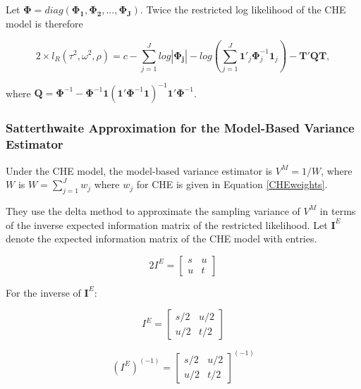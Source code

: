 Let $\mathbf{\Phi} = diag(\mathbf{\Phi_1}, \mathbf{\Phi_2}, ..., \mathbf{\Phi_J})$. Twice the restricted log likelihood of the CHE model is therefore


\begin{equation}\label{LLCHE}
    2\times l_R(\tau^2, \omega^2, \rho) = c - \sum^J_{j=1}log|\mathbf{\Phi_j}| - log(\sum^J_{j=1}\mathbf{1'}_j\mathbf{\Phi}^{-1}_j\mathbf{1}_j)-\mathbf{T}'\mathbf{Q}\mathbf{T},
\end{equation}

where $\mathbf{Q} = \mathbf{\Phi}^{-1}-\mathbf{\Phi}^{-1}\mathbf{1}(\mathbf{1}'\mathbf{\Phi}^{-1}\mathbf{1})^{-1}\mathbf{1}'\mathbf{\Phi}^{-1}$.


\subsubsection{Satterthwaite Approximation for the Model-Based Variance Estimator}

Under the CHE model, the model-based variance estimator is $V^M = 1/W$, where $W$ is $W = \sum^J_{j=1} w_j$ where $w_j$ for CHE is given in Equation \ref{CHEweights}.


They use the delta method to approximate the sampling variance of $V^M$ in terms of the inverse expected information matrix of the restricted likelihood. Let $\mathbf{I}^E$ denote the expected information matrix of the CHE model with entries. 



\begin{equation}
     2I^E = \begin{bmatrix}
                s & u \\
                u & t 
            \end{bmatrix} 
\end{equation}


For the inverse of $\mathbf{I}^E$:

\begin{equation}
     I^E = \begin{bmatrix}
                s/2 & u/2 \\
                u/2 & t/2 
            \end{bmatrix} \nonumber
\end{equation}



\begin{equation}
     (I^E)^{(-1)} = \begin{bmatrix}
                s/2 & u/2 \\
                u/2 & t/2 
            \end{bmatrix}^{(-1)} \nonumber
\end{equation}


